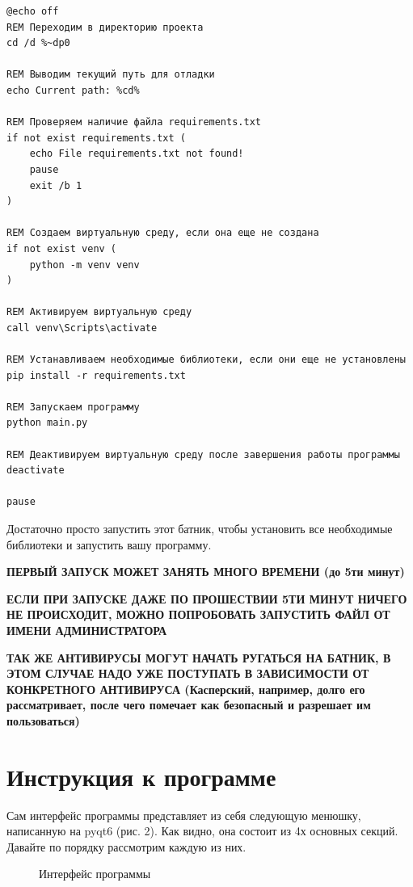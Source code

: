 \documentclass{article}
\begin{document}
\begin{verbatim}
@echo off
REM Переходим в директорию проекта
cd /d %~dp0

REM Выводим текущий путь для отладки
echo Current path: %cd%

REM Проверяем наличие файла requirements.txt
if not exist requirements.txt (
    echo File requirements.txt not found!
    pause
    exit /b 1
)

REM Создаем виртуальную среду, если она еще не создана
if not exist venv (
    python -m venv venv
)

REM Активируем виртуальную среду
call venv\Scripts\activate

REM Устанавливаем необходимые библиотеки, если они еще не установлены
pip install -r requirements.txt

REM Запускаем программу
python main.py

REM Деактивируем виртуальную среду после завершения работы программы
deactivate

pause
\end{verbatim}

Достаточно просто запустить этот батник, чтобы установить все необходимые библиотеки и запустить вашу программу. 


\textbf{ПЕРВЫЙ ЗАПУСК МОЖЕТ ЗАНЯТЬ МНОГО ВРЕМЕНИ (до 5ти минут)}

\textbf{ЕСЛИ ПРИ ЗАПУСКЕ ДАЖЕ ПО ПРОШЕСТВИИ 5ТИ МИНУТ НИЧЕГО НЕ ПРОИСХОДИТ, МОЖНО ПОПРОБОВАТЬ ЗАПУСТИТЬ ФАЙЛ ОТ ИМЕНИ АДМИНИСТРАТОРА}

\textbf{ТАК ЖЕ АНТИВИРУСЫ МОГУТ НАЧАТЬ РУГАТЬСЯ НА БАТНИК, В ЭТОМ СЛУЧАЕ НАДО УЖЕ ПОСТУПАТЬ В ЗАВИСИМОСТИ ОТ КОНКРЕТНОГО АНТИВИРУСА (Касперский, например, долго его рассматривает, после чего помечает как безопасный и разрешает им пользоваться)}
\section{Инструкция к программе}
Сам интерфейс программы представляет из себя следующую менюшку, написанную на pyqt6 (рис. 2). Как видно, она состоит из 4х основных секций. Давайте по порядку рассмотрим каждую из них.
\begin{figure}[hbt!]
\begin{minipage}[h]{\linewidth}
\end{minipage}
\caption{Интерфейс программы}
\end{figure}
\end{document}

